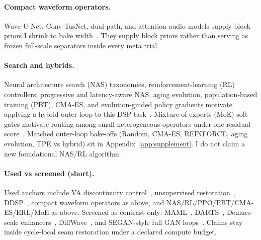 \paragraph{Compact waveform operators.}
Wave-U-Net, Conv-TasNet, dual-path, and attention audio models supply block priors I shrink to bake width~\cite{stoller2018,luo2019,luo2020dprnn,subakan2021,ronneberger2015,he2016resnet,vaswani2017}.
They supply block priors rather than serving as frozen full-scale separators inside every meta trial.

\paragraph{Search and hybrids.}
Neural architecture search (NAS) taxonomies, reinforcement-learning (RL) controllers, progressive and latency-aware NAS, aging evolution, population-based training (PBT), CMA-ES, and evolution-guided policy gradients motivate applying a hybrid outer loop to this DSP task~\cite{elsken2019,zoph2017nas,pham2018,liu2018pnas,tan2019mnasnet,real2019,jaderberg2017,hansen2016cmaes,khadka2018,schulman2017}.
Mixture-of-experts (MoE) soft gates motivate routing among small heterogeneous operators under one residual score~\cite{shazeer2017}.
Matched outer-loop bake-offs (Random, CMA-ES, REINFORCE, aging evolution, TPE vs hybrid) sit in Appendix~\ref{app:supplement}.
I do not claim a new foundational NAS/RL algorithm.

\paragraph{Used vs screened (short).}
Used anchors include VA discontinuity control~\cite{stilson1996,esqueda2016blamp,nam2009polyblep}, unsupervised restoration~\cite{lehtinen2018,kashyap2021n2n,wisdom2020}, DDSP~\cite{engel2020}, compact waveform operators as above, and NAS/RL/PPO/PBT/CMA-ES/ERL/MoE as above.
Screened as contrast only: MAML~\cite{finn2017}, DARTS~\cite{liu2019}, Demucs-scale enhancers~\cite{dfossez2019,dfossez2021}, DiffWave~\cite{kong2021}, and SEGAN-style full GAN loops~\cite{pascual2017}.
Claims stay inside cycle-local seam restoration under a declared compute budget.
